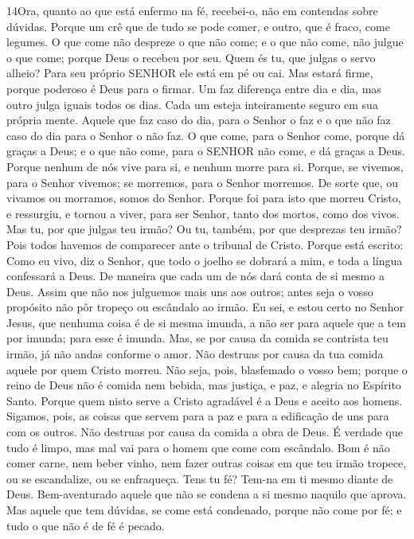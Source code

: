 \lettrine{14} Ora, quanto ao que está enfermo na fé,
recebei-o, não em contendas sobre dúvidas. Porque um crê que de
tudo se pode comer, e outro, que é fraco, come legumes. O que
come não despreze o que não come; e o que não come, não julgue o que
come; porque Deus o recebeu por seu. Quem és tu, que julgas o
servo alheio? Para seu próprio SENHOR ele está em pé ou cai. Mas
estará firme, porque poderoso é Deus para o firmar. Um faz
diferença entre dia e dia, mas outro julga iguais todos os dias.
Cada um esteja inteiramente seguro em sua própria mente. Aquele
que faz caso do dia, para o Senhor o faz e o que não faz caso do dia
para o Senhor o não faz. O que come, para o Senhor come, porque dá
graças a Deus; e o que não come, para o SENHOR não come, e dá graças
a Deus. Porque nenhum de nós vive para si, e nenhum morre para
si. Porque, se vivemos, para o Senhor vivemos; se morremos, para
o Senhor morremos. De sorte que, ou vivamos ou morramos, somos do
Senhor. Porque foi para isto que morreu Cristo, e ressurgiu, e
tornou a viver, para ser Senhor, tanto dos mortos, como dos vivos.
Mas tu, por que julgas teu irmão? Ou tu, também, por que
desprezas teu irmão? Pois todos havemos de comparecer ante o
tribunal de Cristo. Porque está escrito: Como eu vivo, diz o
Senhor, que todo o joelho se dobrará a mim, e toda a língua
confessará a Deus. De maneira que cada um de nós dará conta
de si mesmo a Deus. Assim que não nos julguemos mais uns aos
outros; antes seja o vosso propósito não pôr tropeço ou escândalo ao
irmão. Eu sei, e estou certo no Senhor Jesus, que nenhuma
coisa é de si mesma imunda, a não ser para aquele que a tem por
imunda; para esse é imunda. Mas, se por causa da comida se
contrista teu irmão, já não andas conforme o amor. Não destruas por
causa da tua comida aquele por quem Cristo morreu. Não seja,
pois, blasfemado o vosso bem; porque o reino de Deus não é
comida nem bebida, mas justiça, e paz, e alegria no Espírito Santo.
Porque quem nisto serve a Cristo agradável é a Deus e aceito
aos homens. Sigamos, pois, as coisas que servem para a paz e
para a edificação de uns para com os outros. Não destruas por
causa da comida a obra de Deus. É verdade que tudo é limpo, mas mal
vai para o homem que come com escândalo. Bom é não comer
carne, nem beber vinho, nem fazer outras coisas em que teu irmão
tropece, ou se escandalize, ou se enfraqueça. Tens tu fé?
Tem-na em ti mesmo diante de Deus. Bem-aventurado aquele que não se
condena a si mesmo naquilo que aprova. Mas aquele que tem
dúvidas, se come está condenado, porque não come por fé; e tudo o
que não é de fé é pecado.

